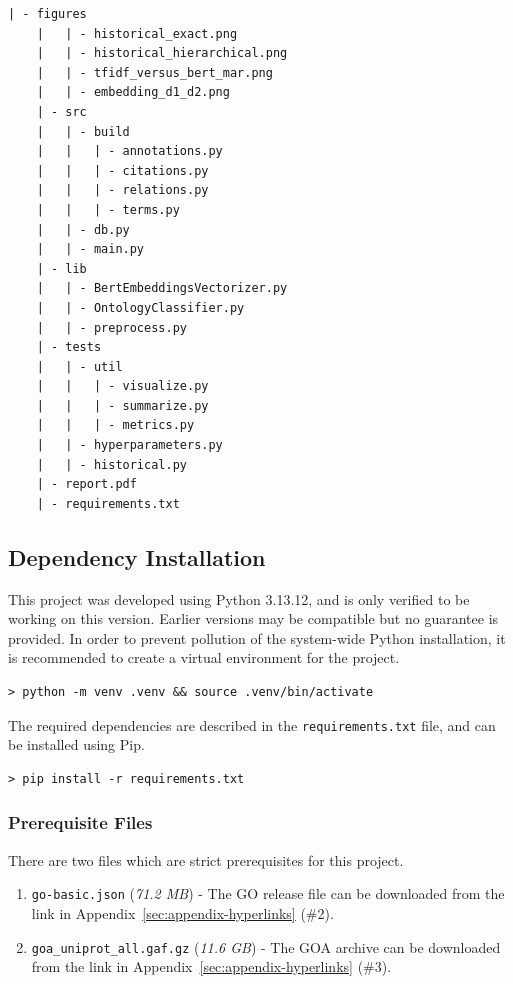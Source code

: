 \documentclass[11pt]{article}
\theoremstyle{plain}
\theoremstyle{definition}
\begin{document}
\begin{Verbatim}[frame=single, fontsize=\small]
    | - figures
    |   | - historical_exact.png
    |   | - historical_hierarchical.png
    |   | - tfidf_versus_bert_mar.png
    |   | - embedding_d1_d2.png
    | - src
    |   | - build
    |   |   | - annotations.py
    |   |   | - citations.py
    |   |   | - relations.py
    |   |   | - terms.py
    |   | - db.py
    |   | - main.py
    | - lib
    |   | - BertEmbeddingsVectorizer.py
    |   | - OntologyClassifier.py
    |   | - preprocess.py
    | - tests
    |   | - util
    |   |   | - visualize.py
    |   |   | - summarize.py
    |   |   | - metrics.py
    |   | - hyperparameters.py
    |   | - historical.py
    | - report.pdf
    | - requirements.txt
\end{Verbatim}

\subsection{Dependency Installation}\label{sec:manual-dependency}

This project was developed using Python 3.13.12, and is only verified to be working on this version. Earlier versions may be compatible but no guarantee is provided. In order to prevent pollution of the system-wide Python installation, it is recommended to create a virtual environment for the project.

\begin{Verbatim}[frame=single, fontsize=\small]
    > python -m venv .venv && source .venv/bin/activate
\end{Verbatim}

The required dependencies are described in the \verb|requirements.txt| file, and can be installed using Pip.

\begin{Verbatim}[frame=single, fontsize=\small]
    > pip install -r requirements.txt
\end{Verbatim}

\subsubsection{Prerequisite Files}\label{sec:manual-dependency-prereq}

There are two files which are strict prerequisites for this project.

\begin{enumerate}
    \item \verb|go-basic.json| (\textit{71.2 MB}) - The GO release file can be downloaded from the link in Appendix~\ref{sec:appendix-hyperlinks} (\#2).
    \item \verb|goa_uniprot_all.gaf.gz| (\textit{11.6 GB}) - The GOA archive can be downloaded from the link in Appendix~\ref{sec:appendix-hyperlinks} (\#3).
\end{enumerate}
\end{document}
